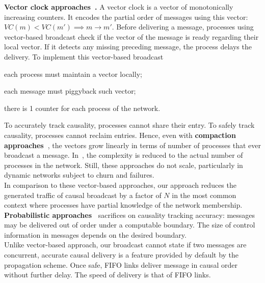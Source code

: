 \noindent \textbf{Vector clock
  approaches~\cite{fidge1988timestamps,mattern1989virtual}.}  A vector clock is
a vector of monotonically increasing counters.  It encodes the partial order of
messages using this vector: $VC(m) < VC(m') \implies m \rightarrow m'$.  Before
delivering a message, processes using vector-based broadcast check if the vector
of the message is ready regarding their local vector. If it detects any missing
preceding message, the process delays the delivery.  To implement this
vector-based broadcast
\begin{inparaenum}[(i)]
\item each process must maintain a vector locally;
\item each message must piggyback such vector;
\item there is 1 counter for each process of the network.
\end{inparaenum}
To accurately track causality, processes cannot share their entry. To safely
track causality, processes cannot reclaim entries. Hence, even with
\textbf{compaction approaches~\cite{singhal1992efficient}}, the vectors grow
linearly in terms of number of processes that ever broadcast a message.
In~\cite{almeida2008interval}, the complexity is reduced to the actual number of
processes in the network.  Still, these approaches do not scale, particularly in
dynamic networks subject to churn and failures. \\
In comparison to these vector-based approaches, our approach reduces the
generated traffic of causal broadcast by a factor of $N$ in the most common
context where processes have partial knowledge of the network membership. \\
\textbf{Probabilistic approaches~\cite{mostefaoui2017probabilistic}} sacrifices
on causality tracking accuracy: messages may be delivered out of order under a
computable boundary. The size of control information in messages
depends on the desired boundary. \\
Unlike vector-based approach, our broadcast cannot state if two messages are
concurrent, accurate causal delivery is a feature provided by default by the
propagation scheme. Once safe, FIFO links deliver message in causal order
without further delay. The speed of delivery is that of FIFO links.


